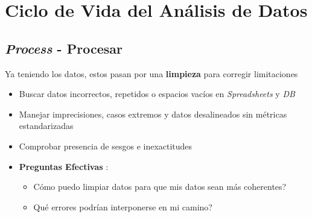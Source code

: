 \section{Ciclo de Vida del Análisis de Datos}




\subsection{\textit{Process} - Procesar}
Ya teniendo los datos, estos pasan por una \textbf{limpieza} para corregir limitaciones
\begin{itemize}
    \item {Buscar datos incorrectos, repetidos o espacios vacíos en \textit{Spreadsheets} y \textit{DB}}
    \item {Manejar imprecisiones, casos extremos y datos desalineados sin métricas estandarizadas}
    \item {Comprobar presencia de sesgos e inexactitudes}
    \item {\textbf{Preguntas Efectivas} :
    \begin{itemize}
        \item {Cómo puedo limpiar datos para que mis datos sean más coherentes?}
        \item {Qué errores podrían interponerse en mi camino?}
    \end{itemize}}
\end{itemize}

